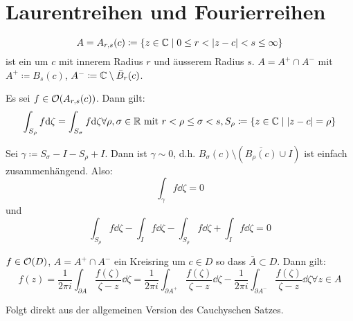 \chapter{Laurentreihen und Fourierreihen}
\[ A=A_{r,s}(c)\coloneqq\lbrace z\in\C\mid 0\leq r<|z-c|<s\leq\infty\rbrace \] ist ein  um $ c $ mit innerem Radius $ r $ und \"ausserem Radius $ s $. $ A=A^+\cap A^- $ mit $ A^+\coloneqq B_s(c) $, $ A^-\coloneqq\mathbb{C}\setminus\bar B_r(c) $.
\begin{satz}
	Es sei $ f\in\mathcal O(A_{r,s}(c)) $. Dann gilt:
	\[ \int_{S_\rho} f\mathrm d\zeta=\int_{S_\sigma} f\mathrm d\zeta\forall \rho,\sigma\in\mathbb{R}\text{ mit }r<\rho\leq\sigma<s, S_\rho\coloneqq\lbrace z\in\mathbb{C}\mid |z-c|=\rho\rbrace \]
\end{satz}
\begin{beweis}
	Sei $ \gamma\coloneqq S_\sigma-I-S_\rho+I $. Dann ist $ \gamma\sim 0 $, d.h. $ B_\sigma(c)\setminus(\overline{B_\rho(c)}\cup I) $ ist einfach zusammenh\"angend. Also:
	\[ \int_{\gamma}^{}f\dd\zeta=0 \]
	und
	\[ \int_{S_\rho} f\dd\zeta-\int_I f\dd\zeta-\int_{S_\rho}f\dd\zeta+\int_I f\dd\zeta=0 \]
\end{beweis}
\begin{satz}
	$ f\in\mathcal O(D) $, $ A=A^+\cap A^- $ ein Kreisring um $ c\in D $ so dass $ \bar A\subset D $. Dann gilt:
	\[ f(z)=\frac{1}{2\pi i}\int_{\partial A}^{}\frac{f(\zeta)}{\zeta-z}\dd\zeta=\frac{1}{2\pi i}\int_{\partial A^+}^{}\frac{f(\zeta)}{\zeta-z}\dd\zeta-\frac{1}{2\pi i}\int_{\partial A^-}^{}\frac{f(\zeta)}{\zeta-z}\dd\zeta\forall z\in A \]
\end{satz}
\newpage
\begin{beweis}
	Folgt direkt aus der allgemeinen Version des Cauchyschen Satzes.
\end{beweis}
